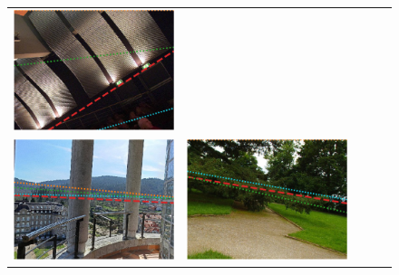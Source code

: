 \begin{figure}
\begin{tabular}{cccc|c}
\includegraphics[width=\exampleresultswidth\linewidth]{figures/method/failures/pano_addwoduaropmic_jpg-4.png} \\
\includegraphics[width=\exampleresultswidth\linewidth]{figures/method/results/pano_addontedcyafqk_jpg-6.png} &
\includegraphics[width=\exampleresultswidth\linewidth]{figures/method/results/pano_addpqpwdfajota_jpg-4.png} &

\end{tabular}
\end{figure}
